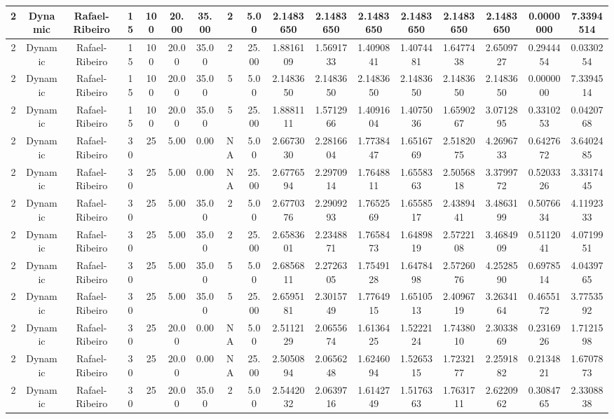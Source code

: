 \begin{longtable}{ | c | c | c | c | c | c | c | c | c | c | c | c | c | c | c | c | c | }
	\hline
	2	&	Dynamic	&	Rafael-Ribeiro	&	15	&	100	&	20.00	&	35.00	&	2	&	5.00	&	2.1483650	&	2.1483650	&	2.1483650	&	2.1483650	&	2.1483650	&	2.1483650	&	0.0000000	&	7.3394514 \\
	\hline
	2	&	Dynamic	&	Rafael-Ribeiro	&	15	&	100	&	20.00	&	35.00	&	2	&	25.00	&	1.8816109	&	1.5691733	&	1.4090841	&	1.4074481	&	1.6477438	&	2.6509727	&	0.2944454	&	0.0330254 \\
	\hline
	2	&	Dynamic	&	Rafael-Ribeiro	&	15	&	100	&	20.00	&	35.00	&	5	&	5.00	&	2.1483650	&	2.1483650	&	2.1483650	&	2.1483650	&	2.1483650	&	2.1483650	&	0.0000000	&	7.3394514 \\
	\hline
	2	&	Dynamic	&	Rafael-Ribeiro	&	15	&	100	&	20.00	&	35.00	&	5	&	25.00	&	1.8881111	&	1.5712966	&	1.4091604	&	1.4075036	&	1.6590267	&	3.0712895	&	0.3310253	&	0.0420768 \\
	\hline
	2	&	Dynamic	&	Rafael-Ribeiro	&	30	&	25	&	5.00	&	0.00	&	NA	&	5.00	&	2.6673030	&	2.2816604	&	1.7738447	&	1.6516769	&	2.5182075	&	4.2696733	&	0.6427672	&	3.6402485 \\
	\hline
	2	&	Dynamic	&	Rafael-Ribeiro	&	30	&	25	&	5.00	&	0.00	&	NA	&	25.00	&	2.6776594	&	2.2970914	&	1.7648811	&	1.6558363	&	2.5056818	&	3.3799772	&	0.5203326	&	3.3317445 \\
	\hline
	2	&	Dynamic	&	Rafael-Ribeiro	&	30	&	25	&	5.00	&	35.00	&	2	&	5.00	&	2.6770376	&	2.2909293	&	1.7652569	&	1.6558517	&	2.4389441	&	3.4863199	&	0.5076634	&	4.1192333 \\
	\hline
	2	&	Dynamic	&	Rafael-Ribeiro	&	30	&	25	&	5.00	&	35.00	&	2	&	25.00	&	2.6583601	&	2.2348871	&	1.7658473	&	1.6489819	&	2.5722108	&	3.4684909	&	0.5112041	&	4.0719951 \\
	\hline
	2	&	Dynamic	&	Rafael-Ribeiro	&	30	&	25	&	5.00	&	35.00	&	5	&	5.00	&	2.6856811	&	2.2726305	&	1.7549128	&	1.6478498	&	2.5726076	&	4.2528590	&	0.6978514	&	4.0439765 \\
	\hline
	2	&	Dynamic	&	Rafael-Ribeiro	&	30	&	25	&	5.00	&	35.00	&	5	&	25.00	&	2.6595181	&	2.3015749	&	1.7764915	&	1.6510513	&	2.4096719	&	3.2634164	&	0.4655172	&	3.7753592 \\
	\hline
	2	&	Dynamic	&	Rafael-Ribeiro	&	30	&	25	&	20.00	&	0.00	&	NA	&	5.00	&	2.5112129	&	2.0655674	&	1.6136425	&	1.5222124	&	1.7438010	&	2.3033869	&	0.2316926	&	1.7121598 \\
	\hline
	2	&	Dynamic	&	Rafael-Ribeiro	&	30	&	25	&	20.00	&	0.00	&	NA	&	25.00	&	2.5050894	&	2.0656248	&	1.6246094	&	1.5265315	&	1.7232177	&	2.2591882	&	0.2134821	&	1.6707873 \\
	\hline
	2	&	Dynamic	&	Rafael-Ribeiro	&	30	&	25	&	20.00	&	35.00	&	2	&	5.00	&	2.5442032	&	2.0639716	&	1.6142749	&	1.5176363	&	1.7631711	&	2.6220962	&	0.3084765	&	2.3308838 \\

\end{longtable}
